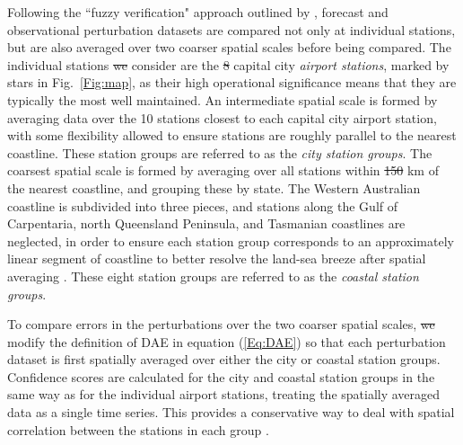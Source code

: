 \documentclass{ametsoc}
\providecommand{\DIFadd}[1]{{\protect\color{blue}\uwave{#1}}} %
\providecommand{\DIFdel}[1]{{\protect\color{red}\sout{#1}}}                      %
\providecommand{\DIFaddbegin}{} %
\providecommand{\DIFaddend}{} %
\providecommand{\DIFdelbegin}{} %
\providecommand{\DIFdelend}{} %
\begin{document}
Following the ``fuzzy verification" approach outlined by \citet{ebert08}, forecast and observational perturbation datasets are compared not only at individual stations, but are also averaged over two coarser spatial scales before being compared. The individual stations \DIFdelbegin \DIFdel{we }\DIFdelend \DIFaddbegin \DIFadd{I }\DIFaddend consider are the \DIFdelbegin \DIFdel{8 }\DIFdelend \DIFaddbegin \DIFadd{7 }\DIFaddend capital city \textit{airport stations}, marked by stars in Fig.~\ref{Fig:map}, as their high operational significance means that they are typically the most well maintained. An intermediate spatial scale is formed by averaging \DIFaddbegin \DIFadd{perturbation }\DIFaddend data over the 10 stations closest to each capital city airport station, with some flexibility allowed to ensure stations are roughly parallel to the nearest coastline. These station groups are referred to as the \textit{city station groups}. The coarsest spatial scale is formed by averaging over all stations within \DIFdelbegin \DIFdel{150 }\DIFdelend \DIFaddbegin \DIFadd{100 }\DIFaddend km of the nearest coastline, and grouping these by state. The Western Australian coastline \DIFaddbegin \DIFadd{(see Fig.~\ref{Fig:map}) }\DIFaddend is subdivided into three pieces, and stations along the Gulf of Carpentaria, north Queensland Peninsula, and Tasmanian coastlines are neglected, in order to ensure each station group corresponds to an approximately linear segment of coastline to better resolve the land-sea breeze after spatial averaging \citep[e.g.][]{vincent16}. These eight station groups are referred to as the \textit{coastal station groups}.

To compare errors in the perturbations over the two coarser spatial scales, \DIFdelbegin \DIFdel{we }\DIFdelend \DIFaddbegin \DIFadd{I }\DIFaddend modify the definition of DAE in equation (\ref{Eq:DAE}) so that each perturbation dataset is first spatially averaged over either the city or coastal station groups. Confidence scores are calculated for the city and coastal station groups in the same way as for the individual airport stations, treating the spatially averaged data as a single time series. This provides a conservative way to deal with spatial correlation between the stations in each group \citep{griffiths17}. 
\end{document}

